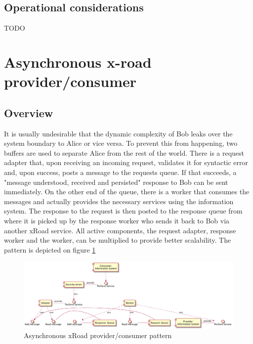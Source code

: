 \documentclass[10pt,a4paper]{article}
\begin{document}
\subsection{Operational considerations}
TODO

\section{Asynchronous x-road provider/consumer}
\label{sec:p:5}
\subsection{Overview}
It is usually undesirable that the dynamic complexity  of Bob leaks over the system boundary to Alice or vice versa. To prevent this from happening, two buffers are used to separate Alice from the rest of the world. There is a request adapter that, upon receiving an incoming request, validates it for syntactic error and, upon success, posts a message to the requests queue. If that succeeds, a "message understood, received and persisted" response to Bob can be sent immediately. On the other end of the queue, there is a worker that consumes the messages and actually provides the necessary services using the information system. The response to the request is then posted to the response queue from where it is picked up by the response worker who sends it back to Bob via another xRoad service. All active components, the request adapter, response worker and the worker, can be multiplied to provide better scalability. The pattern is depicted on figure \ref{fig:p:5}

\begin{figure}[htp]
	\begin{center}
		\includegraphics[width=1\textwidth]{gfx/5_comp.png}
		\caption{Asynchronous xRoad provider/consumer pattern}
		\label{fig:p:5}
	\end{center}
\end{figure}
\end{document}
